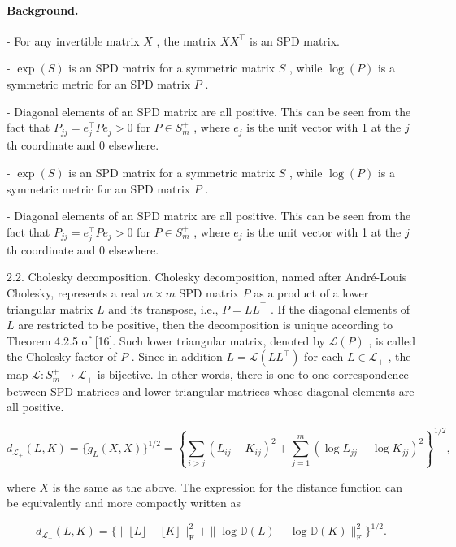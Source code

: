 \documentclass[11pt]{article}
\begin{document}
\paragraph{Background.}
- For any invertible matrix  $X$ , the matrix  $XX^{\top}$  is an SPD matrix.

-  $\exp(S)$  is an SPD matrix for a symmetric matrix  $S$ , while  $\log(P)$  is a symmetric metric for an SPD matrix  $P$ .

- Diagonal elements of an SPD matrix are all positive. This can be seen from the fact that  $P_{jj} = e_j^\top Pe_j > 0$  for  $P \in S_m^+$ , where  $e_j$  is the unit vector with 1 at the  $j$ th coordinate and 0 elsewhere.

-  $\exp(S)$  is an SPD matrix for a symmetric matrix  $S$ , while  $\log(P)$  is a symmetric metric for an SPD matrix  $P$ .

- Diagonal elements of an SPD matrix are all positive. This can be seen from the fact that  $P_{jj} = e_j^\top Pe_j > 0$  for  $P \in S_m^+$ , where  $e_j$  is the unit vector with 1 at the  $j$ th coordinate and 0 elsewhere.

2.2. Cholesky decomposition. Cholesky decomposition, named after André-Louis Cholesky, represents a real  $m \times m$  SPD matrix  $P$  as a product of a lower triangular matrix  $L$  and its transpose, i.e.,  $P = LL^{\top}$ . If the diagonal elements of  $L$  are restricted to be positive, then the decomposition is unique according to Theorem 4.2.5 of [16]. Such lower triangular matrix, denoted by  $\mathcal{L}(P)$ , is called the Cholesky factor of  $P$ . Since in addition  $L = \mathcal{L}(LL^{\top})$  for each  $L \in \mathcal{L}_{+}$ , the map  $\mathcal{L}: S_{m}^{+} \to \mathcal{L}_{+}$  is bijective. In other words, there is one-to-one correspondence between SPD matrices and lower triangular matrices whose diagonal elements are all positive.

$$
d _ {\mathcal {L} _ {+}} (L, K) = \{\tilde {g} _ {L} (X, X) \} ^ {1 / 2} = \left\{\sum_ {i > j} (L _ {i j} - K _ {i j}) ^ {2} + \sum_ {j = 1} ^ {m} (\log L _ {j j} - \log K _ {j j}) ^ {2} \right\} ^ {1 / 2},
$$

where  $X$  is the same as the above. The expression for the distance function can be equivalently and more compactly written as

$$
d _ {\mathcal {L} _ {+}} (L, K) = \{\| \lfloor L \rfloor - \lfloor K \rfloor \| _ {\mathrm {F}} ^ {2} + \| \log \mathbb {D} (L) - \log \mathbb {D} (K) \| _ {\mathrm {F}} ^ {2} \} ^ {1 / 2}.
$$
\end{document}
